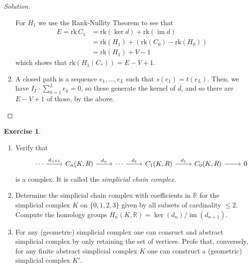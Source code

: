 \documentclass[a4paper,12pt]{article}
\newenvironment{solution}
  {\renewcommand\qedsymbol{$\blacksquare$}\begin{proof}[Solution]}
  {\end{proof}}
\DeclareMathOperator{\im}{im}
\theoremstyle{definition}
\newtheorem{exercise}{Exercise}
\begin{document}
\begin{solution}
\begin{enumerate}[label = \alph*)]
    For $H_1$ we use the Rank-Nullity Theorem to see that 
    \begin{align*} 
    E = \text{rk}\, C_1 & = \text{rk} (\ker d) + \text{rk}(\im d)\\
    & = \text{rk}(H_1) + (\text{rk}(C_0) - \text{rk}(H_0))\\
    & = \text{rk}(H_1) + V - 1
    \end{align*}
    which shows that $\text{rk}(H_1(C_*)) = E - V + 1$. 
    \item A closed path is a sequence $e_1, \dots , e_L$ such that $s(e_1) = t(e_L)$. Then, we have $I_{\Gamma} \cdot \sum_{k=1}^L e_k = 0$, so these generate the kernel of $d$, and so there are $E -V +1$ of those, by the above. 
\end{enumerate}
\end{solution}


\begin{exercise}
\begin{enumerate}[label = \alph*)]
    \item Verify that 
    \begin{equation*}
        \begin{tikzcd}
        & \cdots \arrow[r, "d_{n+1}"] & C_n(K, R) \arrow[r, "d_n"] & \cdots \arrow[r, "d_2"] & C_1(K,R) \arrow[r, "d_1"] & C_0(K,R) \arrow[r] & 0
        \end{tikzcd}
    \end{equation*}
    is a complex. It is called the \textit{simplicial chain complex}. 
    \item Determine the simplicial chain complex with coefficients in $\mathbb{R}$ for the simplicial complex $K$ on $\{0, 1, 2, 3\}$ given  by all subsets of cardinality $\leq 2$. Compute the homology groups $H_n(K,\mathbb{R}) = \ker(d_n)/\im(d_{n+1})$. 
    \item For any (geometric) simplicial complex one can consruct and abstract simplicial complex by only retaining the set of vertices. Profe that, conversely, for any finite abstract simplicial complex $K$ one can construct a (geometric) simplicial complex $K'$. 
\end{enumerate}
\end{exercise}
\end{document}
